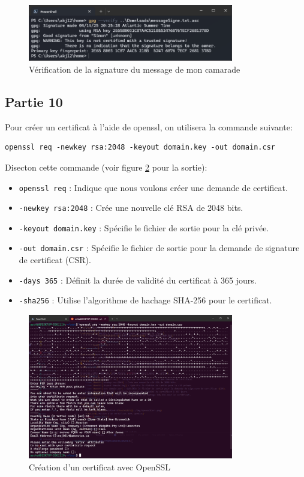 \documentclass[12pt,a4paper]{article}
\begin{document}
\begin{enumerate}[label=\Roman*]
          \begin{figure}[ht]
              \centering
              \includegraphics[width=0.8\textwidth]{../img/verifSimon.png}
              \caption{Vérification de la signature du message de mon camarade}
              \label{verifSimon}
          \end{figure}
\end{enumerate}

\subsection{Partie 10}
Pour créer un certificat à l'aide de openssl, on utilisera la commande suivante:
\begin{Verbatim}[fontsize=\footnotesize]
    openssl req -newkey rsa:2048 -keyout domain.key -out domain.csr
\end{Verbatim}

Disecton cette commande (voir figure \ref{opensslCert} pour la sortie):
\begin{itemize}
    \item \texttt{openssl req} : Indique que nous voulons créer une demande de certificat.
    \item \texttt{-newkey rsa:2048} : Crée une nouvelle clé RSA de 2048 bits.
    \item \texttt{-keyout domain.key} : Spécifie le fichier de sortie pour la clé privée.
    \item \texttt{-out domain.csr} : Spécifie le fichier de sortie pour la demande de signature de certificat (CSR).
    \item \texttt{-days 365} : Définit la durée de validité du certificat à 365 jours.
    \item \texttt{-sha256} : Utilise l'algorithme de hachage SHA-256 pour le certificat.
\end{itemize}

\begin{figure}[ht]
    \centering
    \includegraphics[width=0.8\textwidth]{../img/opensslCert.png}
    \caption{Création d'un certificat avec OpenSSL}
    \label{opensslCert}
\end{figure}
\end{document}
